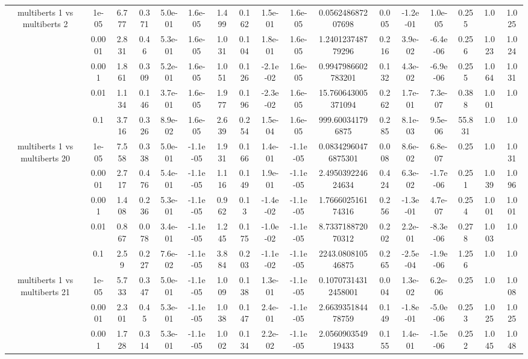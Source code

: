 \begin{tabular}{|c|c|c|c|c|c|c|c|c|c|c|c|c|c|c|c|c|}
\hline
\multirow{5}{*}{multiberts 1 vs multiberts 2} & 1e-05 & 6.777 & 0.371 & 5.0e-01 & 1.6e-05 & 1.499 & 0.162 & 1.5e-01 & 1.6e-05 & 0.056248687207698 & 0.005 & -1.2e-01 & 1.0e-05 & 0.255 & 1.0 & 1.025 \\
 & 0.0001 & 2.831 & 0.46 & 5.3e-01 & 1.6e-05 & 1.031 & 0.104 & 1.8e-01 & 1.6e-05 & 1.240123748779296 & 0.216 & 3.9e-02 & -6.4e-06 & 0.256 & 1.023 & 1.024 \\
 & 0.001 & 1.861 & 0.309 & 5.2e-01 & 1.6e-05 & 1.051 & 0.126 & -2.1e-02 & 1.6e-05 & 0.9947986602783201 & 0.132 & 4.3e-02 & -6.9e-06 & 0.255 & 1.064 & 1.031 \\
 & 0.01 & 1.134 & 0.146 & 3.7e-01 & 1.6e-05 & 1.977 & 0.196 & -2.3e-02 & 1.6e-05 & 15.760643005371094 & 0.262 & 1.7e-01 & 7.3e-07 & 0.388 & 1.001 & 1.0 \\
 & 0.1 & 3.716 & 0.326 & 8.9e-02 & 1.6e-05 & 2.639 & 0.254 & 1.5e-04 & 1.6e-05 & 999.600341796875 & 0.285 & 8.1e-03 & 9.5e-06 & 55.831 & 1.0 & 1.0 \\
\hline
\multirow{5}{*}{multiberts 1 vs multiberts 20} & 1e-05 & 7.558 & 0.338 & 5.0e-01 & -1.1e-05 & 1.931 & 0.166 & 1.4e-01 & -1.1e-05 & 0.08342960476875301 & 0.008 & 8.6e-02 & 6.8e-07 & 0.25 & 1.0 & 1.031 \\
 & 0.0001 & 2.717 & 0.476 & 5.4e-01 & -1.1e-05 & 1.116 & 0.149 & 1.9e-01 & -1.1e-05 & 2.495039224624634 & 0.424 & 6.3e-02 & -1.7e-06 & 0.251 & 1.039 & 1.096 \\
 & 0.001 & 1.408 & 0.236 & 5.3e-01 & -1.1e-05 & 0.962 & 0.13 & -1.4e-02 & -1.1e-05 & 1.766602516174316 & 0.256 & -1.3e-01 & 4.7e-07 & 0.254 & 1.001 & 1.001 \\
 & 0.01 & 0.867 & 0.078 & 3.4e-01 & -1.1e-05 & 1.245 & 0.175 & -1.0e-02 & -1.1e-05 & 8.733718872070312 & 0.202 & 2.2e-01 & -8.3e-06 & 0.278 & 1.003 & 1.0 \\
 & 0.1 & 2.59 & 0.227 & 7.6e-02 & -1.1e-05 & 3.884 & 0.203 & -1.1e-02 & -1.1e-05 & 2243.080810546875 & 0.265 & -2.5e-04 & -1.9e-06 & 1.256 & 1.0 & 1.0 \\
\hline
\multirow{5}{*}{multiberts 1 vs multiberts 21} & 1e-05 & 5.733 & 0.347 & 5.0e-01 & -1.1e-05 & 1.009 & 0.138 & 1.3e-01 & -1.1e-05 & 0.10707314312458001 & 0.004 & 1.3e-02 & 6.2e-06 & 0.25 & 1.0 & 1.008 \\
 & 0.0001 & 2.301 & 0.45 & 5.3e-01 & -1.1e-05 & 1.038 & 0.147 & 2.4e-01 & -1.1e-05 & 2.663935184478759 & 0.149 & -1.8e-01 & -5.0e-06 & 0.253 & 1.025 & 1.025 \\
 & 0.001 & 1.728 & 0.314 & 5.3e-01 & -1.1e-05 & 1.002 & 0.134 & 2.2e-02 & -1.1e-05 & 2.056090354919433 & 0.155 & 1.4e-01 & -1.5e-06 & 0.252 & 1.045 & 1.048 \\

\end{tabular}
